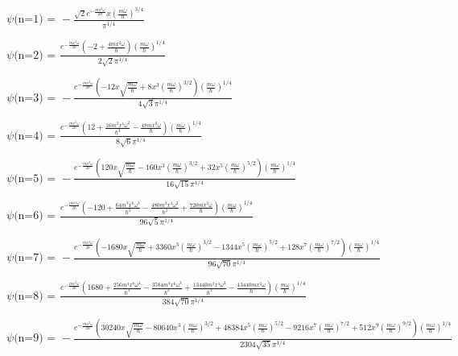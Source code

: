 \documentclass[12pt]{article}
\begin{document}
{\small
{}\\
\noindent\(\text{$\psi $(n=}1\text{) =  }-\frac{\sqrt{2} e^{-\frac{m x^2 \omega }{2 \hbar }} x \left(\frac{m \omega }{\hbar }\right)^{3/4}}{\pi ^{1/4}}\)

\noindent\(\text{$\psi $(n=}2\text{) =  }\frac{e^{-\frac{m x^2 \omega }{2 \hbar }} \left(-2+\frac{4 m x^2 \omega }{\hbar }\right) \left(\frac{m \omega
}{\hbar }\right)^{1/4}}{2 \sqrt{2} \pi ^{1/4}}\)

\noindent\(\text{$\psi $(n=}3\text{) =  }-\frac{e^{-\frac{m x^2 \omega }{2 \hbar }} \left(-12 x \sqrt{\frac{m \omega }{\hbar }}+8 x^3 \left(\frac{m
\omega }{\hbar }\right)^{3/2}\right) \left(\frac{m \omega }{\hbar }\right)^{1/4}}{4 \sqrt{3} \pi ^{1/4}}\)

\noindent\(\text{$\psi $(n=}4\text{) =  }\frac{e^{-\frac{m x^2 \omega }{2 \hbar }} \left(12+\frac{16 m^2 x^4 \omega ^2}{\hbar ^2}-\frac{48 m x^2
\omega }{\hbar }\right) \left(\frac{m \omega }{\hbar }\right)^{1/4}}{8 \sqrt{6} \pi ^{1/4}}\)

\noindent\(\text{$\psi $(n=}5\text{) =  }-\frac{e^{-\frac{m x^2 \omega }{2 \hbar }} \left(120 x \sqrt{\frac{m \omega }{\hbar }}-160 x^3 \left(\frac{m
\omega }{\hbar }\right)^{3/2}+32 x^5 \left(\frac{m \omega }{\hbar }\right)^{5/2}\right) \left(\frac{m \omega }{\hbar }\right)^{1/4}}{16 \sqrt{15}
\pi ^{1/4}}\)

\noindent\(\text{$\psi $(n=}6\text{) =  }\frac{e^{-\frac{m x^2 \omega }{2 \hbar }} \left(-120+\frac{64 m^3 x^6 \omega ^3}{\hbar ^3}-\frac{480 m^2
x^4 \omega ^2}{\hbar ^2}+\frac{720 m x^2 \omega }{\hbar }\right) \left(\frac{m \omega }{\hbar }\right)^{1/4}}{96 \sqrt{5} \pi ^{1/4}}\)

\noindent\(\text{$\psi $(n=}7\text{) =  }-\frac{e^{-\frac{m x^2 \omega }{2 \hbar }} \left(-1680 x \sqrt{\frac{m \omega }{\hbar }}+3360 x^3 \left(\frac{m
\omega }{\hbar }\right)^{3/2}-1344 x^5 \left(\frac{m \omega }{\hbar }\right)^{5/2}+128 x^7 \left(\frac{m \omega }{\hbar }\right)^{7/2}\right) \left(\frac{m
\omega }{\hbar }\right)^{1/4}}{96 \sqrt{70} \pi ^{1/4}}\)

\noindent\(\text{$\psi $(n=}8\text{) =  }\frac{e^{-\frac{m x^2 \omega }{2 \hbar }} \left(1680+\frac{256 m^4 x^8 \omega ^4}{\hbar ^4}-\frac{3584 m^3
x^6 \omega ^3}{\hbar ^3}+\frac{13440 m^2 x^4 \omega ^2}{\hbar ^2}-\frac{13440 m x^2 \omega }{\hbar }\right) \left(\frac{m \omega }{\hbar }\right)^{1/4}}{384
\sqrt{70} \pi ^{1/4}}\)

\noindent\(\text{$\psi $(n=}9\text{) =  }-\frac{e^{-\frac{m x^2 \omega }{2 \hbar }} \left(30240 x \sqrt{\frac{m \omega }{\hbar }}-80640 x^3 \left(\frac{m
\omega }{\hbar }\right)^{3/2}+48384 x^5 \left(\frac{m \omega }{\hbar }\right)^{5/2}-9216 x^7 \left(\frac{m \omega }{\hbar }\right)^{7/2}+512 x^9
\left(\frac{m \omega }{\hbar }\right)^{9/2}\right) \left(\frac{m \omega }{\hbar }\right)^{1/4}}{2304 \sqrt{35} \pi ^{1/4}}\)
}
\pagebreak
\end{document}
